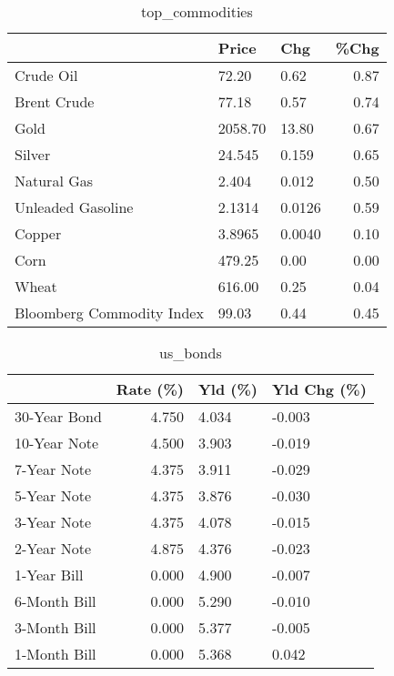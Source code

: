 \documentclass{article}%
\begin{document}
\begin{table}[htbp]%
\caption{top\_commodities}%
\centering%
\begin{adjustbox}{width=1\textwidth}%
\begin{tabular}{lllr}
\toprule
                          &   Price &    Chg &  \%Chg \\
\midrule
               Crude Oil  &   72.20 &   0.62 &  0.87 \\
             Brent Crude  &   77.18 &   0.57 &  0.74 \\
                    Gold  & 2058.70 &  13.80 &  0.67 \\
                  Silver  &  24.545 &  0.159 &  0.65 \\
             Natural Gas  &   2.404 &  0.012 &  0.50 \\
       Unleaded Gasoline  &  2.1314 & 0.0126 &  0.59 \\
                  Copper  &  3.8965 & 0.0040 &  0.10 \\
                    Corn  &  479.25 &   0.00 &  0.00 \\
                   Wheat  &  616.00 &   0.25 &  0.04 \\
Bloomberg Commodity Index &   99.03 &   0.44 &  0.45 \\
\bottomrule
\end{tabular}
%
\end{adjustbox}%
\end{table}

%


\begin{table}[htbp]%
\caption{us\_bonds}%
\centering%
\begin{adjustbox}{width=1\textwidth}%
\begin{tabular}{lrll}
\toprule
             &  Rate (\%) & Yld (\%) & Yld Chg (\%) \\
\midrule
30-Year Bond &     4.750 &   4.034 &      -0.003 \\
10-Year Note &     4.500 &   3.903 &      -0.019 \\
 7-Year Note &     4.375 &   3.911 &      -0.029 \\
 5-Year Note &     4.375 &   3.876 &      -0.030 \\
 3-Year Note &     4.375 &   4.078 &      -0.015 \\
 2-Year Note &     4.875 &   4.376 &      -0.023 \\
 1-Year Bill &     0.000 &   4.900 &      -0.007 \\
6-Month Bill &     0.000 &   5.290 &      -0.010 \\
3-Month Bill &     0.000 &   5.377 &      -0.005 \\
1-Month Bill &     0.000 &   5.368 &       0.042 \\
\bottomrule
\end{tabular}
%
\end{adjustbox}%
\end{table}
\end{document}
